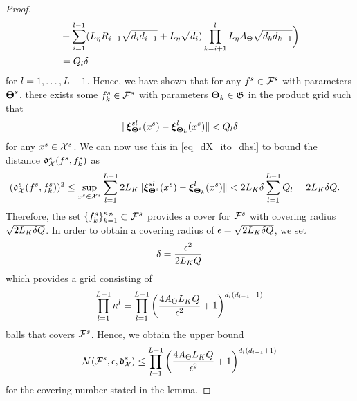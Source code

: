 \documentclass[review,supplement,onefignum,onetabnum]{siamonline250211}
\begin{document}
\begin{proof}
\begin{equation}
\begin{split}
&+
\sum_{i=1}^{l-1}
({L_\eta} {R_{i-1}} \sqrt{{d_i} {d_{i-1}}}
+ {L_\eta} \sqrt{{d_i}})
\prod_{k=i+1}^{l}
{L_\eta} {A_\Theta} \sqrt{{d_k} {d_{k-1}}}
\bigg)\\
&= {Q_l}  \delta
\end{split}
\end{equation}
%
for $l=1, \dots, L-1 $. Hence, we have shown that for any $f^s \in \mathcal{F}^s$ with parameters $\boldsymbol{\Theta}^{s}$, there exists some $f^s_k \in \mathcal{F}^s$ with parameters $\boldsymbol{\Theta}_k \in \mathfrak{G} $ in the product grid such that 
%
\begin{equation*}
\begin{split}
\| \boldsymbol{\xi}^{sl}_{\boldsymbol{\Theta}^{s}}(x^s) - \boldsymbol{\xi}^{l}_{\boldsymbol{\Theta}_k}(x^s)  \|    < {Q_l}  \delta
\end{split}
\end{equation*}
%
for any $x^s \in \mathcal{X}^s$. We can now use this in \eqref{eq_dX_ito_dhsl} to bound the distance $\mathfrak{d}^s_{\mathcal{X}} (f^s, f^s_k)$ as
%
\begin{equation}
\begin{split}
(\mathfrak{d}^s_{\mathcal{X}} (f^s, f^s_k) )^2
& \leq   \sup_{x^s \in \mathcal{X}^s} \sum_{l=1}^{L-1}
2 L_K 
 \|   \boldsymbol{\xi}^{sl}_{\boldsymbol{\Theta}^{s}} (x^s)  -  \boldsymbol{\xi}^{l}_{\boldsymbol{\Theta}_k} (x^s)   \|
< 
2 L_K  \delta \sum_{l=1}^{L-1} {Q_l}
= 2 L_K  \delta {Q}.
\end{split}
\end{equation}
%
Therefore, the set $\{ f^s_k \}_{k=1}^{\kappa_{\mathfrak{G}}} \subset \mathcal{F}^s$ provides a cover for $\mathcal{F}^s$  with covering radius $ \sqrt{2 L_K  \delta {Q}}$. In order to obtain a covering radius of $\epsilon=  \sqrt{2 L_K  \delta {Q}}$, we set 
%
\begin{equation*}
\begin{split}
\delta = \frac{\epsilon^2}{2 L_K {Q}}
\end{split}
\end{equation*}
%
which provides a grid consisting of
%
\begin{equation*}
\begin{split}
\prod_{l=1}^{L-1}  \kappa^l 
= \prod_{l=1}^{L-1}  \left( \frac{4 {A_\Theta}  L_K {Q}}{\epsilon^2}+1  \right)^{ {d_l}({d_{l-1}}+1) }
\end{split}
\end{equation*}
%
balls that covers $\mathcal{F}^s$. Hence, we obtain the upper bound 
%
\begin{equation*}
\begin{split}
\mathcal{N} (  \mathcal{F}^s, \epsilon, \mathfrak{d}^s_{\mathcal{X}} )  \leq \prod_{l=1}^{L-1}  \left( \frac{4 {A_\Theta}  L_K {Q}}{\epsilon^2}+1  \right)^{ {d_l}({d_{l-1}}+1) }
\end{split}
\end{equation*}
%
for the covering number stated in the lemma. 
%
\end{proof}
\end{document}

